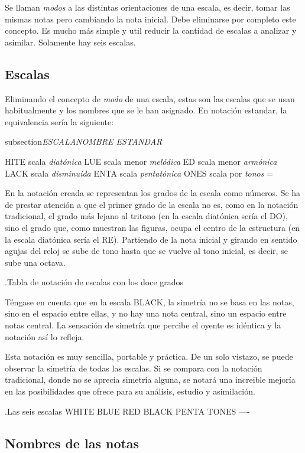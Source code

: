 \documentclass[]{article}
\begin{document}
Se llaman \emph{modos} a las distintas orientaciones de una escala, es decir, tomar las mismas notas pero cambiando la nota inicial. Debe eliminarse por completo este concepto. Es mucho más simple y util reducir la cantidad de escalas a analizar y asimilar. Solamente hay seis escalas.

\subsection{Escalas}

Eliminando el concepto de \emph{modo} de una escala, estas son las escalas que se usan habitualmente y los nombres que se le han asignado. En notación estandar, la equivalencia sería la siguiente:

subsection{\emph{ESCALA}\emph{NOMBRE ESTANDAR}}

HITE scala \emph{diatónica} LUE scala menor \emph{melódica} ED scala menor \emph{armónica} LACK scala \emph{disminuida} ENTA scala \emph{pentatónica} ONES scala por \emph{tonos} =

En la notación creada se representan los grados de la escala como números. Se ha de prestar atención a que el primer grado de la escala no es, como en la notación tradicional, el grado más lejano al tritono (en la escala diatónica sería el DO), sino el grado que, como muestran las figuras, ocupa el centro de la estructura (en la escala diatónica sería el RE). Partiendo de la nota inicial y girando en sentido agujas del reloj se sube de tono hasta que se vuelve al tono inicial, es decir, se sube una octava.

.Tabla de notación de escalas con los doce grados

Téngase en cuenta que en la escala BLACK, la simetría no se basa en las notas, sino en el espacio entre ellas, y no hay una nota central, sino un espacio entre notas central. La sensación de simetría que percibe el oyente es idéntica y la notación así lo refleja.

Esta notación es muy sencilla, portable y práctica. De un solo vistazo, se puede observar la simetría de todas las escalas. Si se compara con la notación tradicional, donde no se aprecia simetría alguna, se notará una increible mejoría en las posibilidades que ofrece para su análisis, estudio y asimilación.

.Las seis escalas WHITE BLUE RED BLACK PENTA TONES ----

\subsection{Nombres de las notas}
\end{document}
